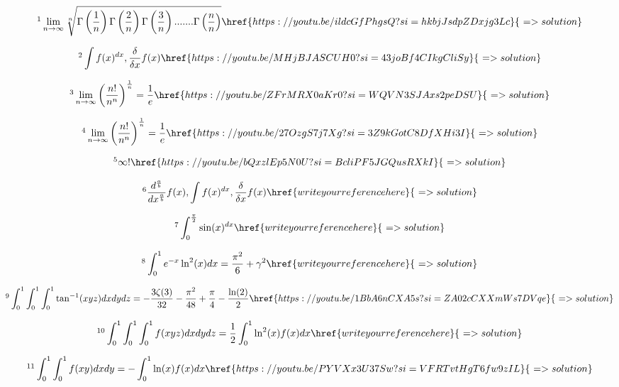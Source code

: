 \documentclass[12pt]{article}
\begin{document}
\[ \footnote{ The is the most beautiful problem I ever solved} \lim_{n\to\infty} \sqrt[n]{\Gamma\left(\frac{1}{n}\right)\Gamma\left(\frac{2}{n}\right)\Gamma\left(\frac{3}{n}\right).......\Gamma\left(\frac{n}{n}\right) } \href{https://youtu.be/ildcGfPhgsQ?si=hkbjJsdpZDxjg3Lc}{\,\,=>solution}   \]

\[ \footnote{ Product Integral and Product Derivative} \int f(x)^{dx} , \frac{\delta}{\delta x}f(x)  \href{https://youtu.be/MHjBJASCUH0?si=43joBf4CIkgCliSy}{\,\,=>solution}   \]

\[ \footnote{ Using the powerful stirling approximation for this IIT limit} \lim_{n\to\infty} \left( \frac{n!}{n^n} \right) ^{\frac{1}{n}}  = \frac{1}{e}  \href{https://youtu.be/ZFrMRX0aKr0?si=WQVN3SJAxs2peDSU}{\,\,=>solution}  \]

\[ \footnote{ Proving this IIT Limit using product integral}  \lim_{n\to\infty} \left( \frac{n!}{n^n} \right) ^{\frac{1}{n}}  = \frac{1}{e} \href{https://youtu.be/27OzgS7j7Xg?si=3Z9kGotC8DfXHi3I}{\,\,=>solution}   \]

\[ \footnote{ Infinity factorial, Happy Birthday Bishnu } \infty ! \href{https://youtu.be/bQxzlEp5N0U?si=BcliPF5JGQusRXkI}{\,\,=>solution}  \]


\[ \footnote{ 500 sub special:: Inventing Math: Fractional Derivative, Product Integral and Product Derivative} \frac{d^{\frac{a}{b}}}{dx^{\frac{a}{b}}} f(x) , \int f(x)^{dx} , \frac{\delta}{\delta x}f(x)  \href{write your reference here}{\,\,=>solution}  \]

\[ \footnote{ Impossible seeming Integrals} \int_0^{\frac{\pi}{2}} \sin(x)^{dx} \href{write your reference here}{\,\,=>solution}  \]

\[ \footnote{ Integral with two important constants} \int_0^{1} e^{-x
} \ln^2(x) dx = \frac{\pi^2}{6}+\gamma^2 \href{write your reference here}{\,\,=>solution}   \]

\[ \footnote{Ridiculously Awesome Impossible Integral} \int_0^1 \int_0^1 \int_0^1 \tan^{-1}(xyz) dx dy dz  = - \frac{3\zeta(3)}{32}-\frac{\pi^2}{48}+\frac{\pi}{4}-\frac{\ln(2)}{2} \href{https://youtu.be/1BbA6nCXA5s?si=ZA02cCXXmWs7DVqe}{\,\,=>solution}  \]

\[ \footnote{Ridiculously Awesome Impossible Integral} \int_0^1 \int_0^1 \int_0^1 f(xyz) dx dy dz    = \frac{1}{2} \int_0^1 \ln^2(x)f(x) dx \href{write your reference here}{\,\,=>solution}  \]

\[ \footnote{Ridiculously Awesome Impossible Integral} \int_0^1 \int_0^1  f(xy) dx dy = - \int_0^1 \ln(x)f(x) dx \href{https://youtu.be/PYVXx3U37Sw?si=VFRTvtHgT6fw9zIL}{\,\,=>solution}  \]
\end{document}
